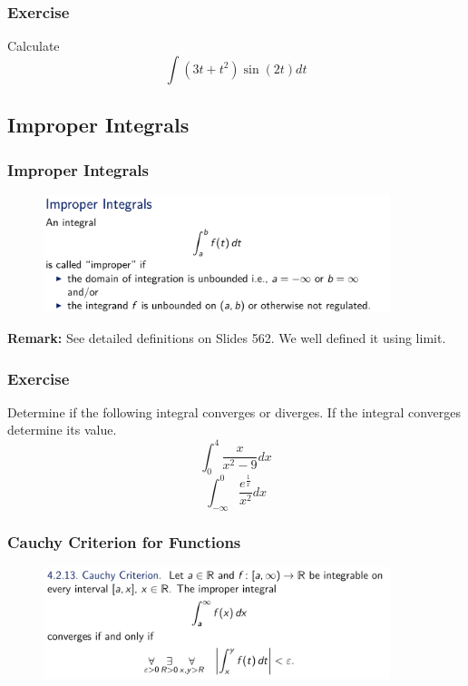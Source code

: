 \documentclass[10pt, t]{beamer}
\begin{document}
\begin{frame}
    \frametitle{Exercise}
    Calculate
    $$\int\left(3 t+t^{2}\right) \sin (2 t) d t$$

\end{frame}

\subsection{Improper Integrals}
\begin{frame}
    \frametitle{Improper Integrals}

    \begin{figure}[H]
        \centering
        \includegraphics[width=0.9\textwidth]{2020-12-02-13-50-24.png}
    \end{figure}

    \textbf{Remark:} See detailed definitions on Slides 562. We well defined it using limit.
\end{frame}

\begin{frame}
    \frametitle{Exercise}

    Determine if the following integral converges or diverges. If the integral converges determine its value.
    $$\int_{0}^{4} \frac{x}{x^{2}-9} d x$$
    $$\int_{-\infty}^{0} \frac{e^{\frac{1}{x}}}{x^{2}} d x$$

\end{frame}

\begin{frame}
    \frametitle{Cauchy Criterion for Functions}
    \begin{figure}[H]
        \centering
        \includegraphics[width=0.9\textwidth]{2020-12-02-13-52-20.png}
    \end{figure}
\end{frame}
\end{document}
